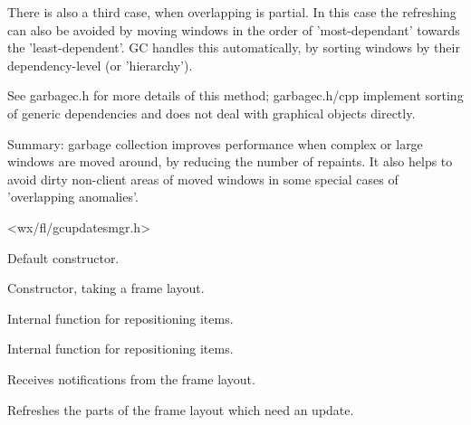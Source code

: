 There is also a third case, when overlapping is partial.
In this case the refreshing can also be avoided by
moving windows in the order of 'most-dependant' towards the
'least-dependent'. GC handles this automatically, by
sorting windows by their dependency-level (or 'hierarchy').

See garbagec.h for more details of this method; garbagec.h/cpp
implement sorting of generic dependencies and does not deal
with graphical objects directly.

Summary: garbage collection improves performance when complex or large
windows are moved around, by reducing the number of repaints. It also helps
to avoid dirty non-client areas of moved windows
in some special cases of 'overlapping anomalies'.




<wx/fl/gcupdatesmgr.h>




\label{cbgcupdatesmgrcbgcupdatesmgr}


Default constructor.



Constructor, taking a frame layout.


\label{cbgcupdatesmgradditem}


Internal function for repositioning items.


\label{cbgcupdatesmgrdorepositionitems}


Internal function for repositioning items.


\label{cbgcupdatesmgronstartchanges}


Receives notifications from the frame layout.


\label{cbgcupdatesmgrupdatenow}


Refreshes the parts of the frame layout which need an update.


